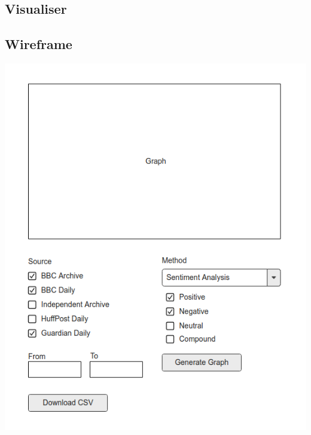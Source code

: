 \documentclass[12pt,a4paper]{article}
\begin{document}
\begin{appendices}
\section{Visualiser}
\begin{subappendices}
\subsection{Wireframe} \label{app:vis-wireframe}
\includegraphics[width=\linewidth]{../visualisation/wireframe.png}


\end{subappendices}
\end{appendices}
\end{document}

